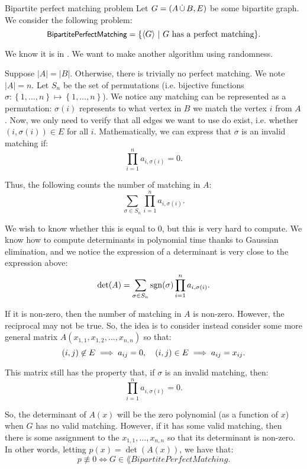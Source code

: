 \documentclass[a4paper]{article}
\begin{document}
\begin{parag}{Bipartite perfect matching problem}
    Let $G = \left(A \dcup B, E\right)$ be some bipartite graph. We consider the following problem: 
    \[\lang{BipartitePerfectMatching} = \left\{\left\langle G \right\rangle \suchthat \text{$G$ has a perfect matching}\right\}.\]

    We know it is in . We want to make another algorithm using randomness.

    Suppose $\left|A\right| = \left|B\right|$. Otherwise, there is trivially no perfect matching. We note $\left|A\right| = n$. Let $S_n$ be the set of permutations (i.e. bijective functions $\sigma: \left\{1, \ldots, n\right\} \mapsto \left\{1, \ldots, n\right\}$). We notice any matching can be represented as a permutation: $\sigma\left(i\right)$ represents to what vertex in $B$ we match the vertex $i$ from $A$. Now, we only need to verify that all edges we want to use do exist, i.e. whether $\left(i, \sigma\left(i\right)\right) \in E$ for all $i$. Mathematically, we can express that $\sigma$ is an invalid matching if:
    \[\prod_{i=1}^{n} a_{i, \sigma\left(i\right)} = 0.\]
    
    Thus, the following counts the number of matching in $A$: 
    \[\sum_{\sigma \in S_n} \prod_{i=1}^{n} a_{i, \sigma\left(i\right)}.\]

    We wish to know whether this is equal to 0, but this is very hard to compute. We know how to compute determinants in polynomial time thanks to Gaussian elimination, and we notice the expression of a determinant is very close to the expression above:
    \[\det\left(A\right) = \sum_{\sigma \in S_n} \sgn\left(\sigma\right) \prod_{i=1}^{n} a_{i, \sigma\left(i\right)}.\]

    If it is non-zero, then the number of matching in $A$ is non-zero. However, the reciprocal may not be true. So, the idea is to consider instead consider some more general matrix $A\left(x_{1, 1}, x_{1, 2}, \ldots, x_{n,n}\right)$ so that: 
    \[\left(i, j\right) \not \in E \implies a_{ij} = 0, \mathspace \left(i, j\right) \in E \implies a_{ij} = x_{ij}.\]

    This matrix still has the property that, if $\sigma$ is an invalid matching, then:
    \[\prod_{i=1}^{n} a_{i, \sigma\left(i\right)} = 0.\]

    So, the determinant of $A\left(x\right)$ will be the zero polynomial (as a function of $x$) when $G$ has no valid matching. However, if it has some valid matching, then there is some assignment to the $x_{1,1}, \ldots, x_{n,n}$ so that its determinant is non-zero. In other words, letting $p\left(x\right) = \det\left(A\left(x\right)\right)$, we have that: 
    \[p \not\equiv 0 \iff G \in \lang{BipartitePerfectMatching}.\]
    

\end{parag}
\end{document}
